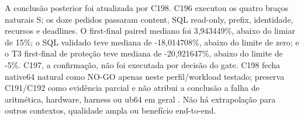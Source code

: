 A conclusão posterior foi atualizada por C198. C196 executou os quatro braços naturais S; os doze pedidos passaram content, SQL read-only, prefix, identidade, recursos e deadlines. O first-final paired mediano foi 3,943449\%, abaixo do limiar de 15\%; o SQL validado teve mediana de -18,014708\%, abaixo do limite de zero; e o T3 first-final de proteção teve mediana de -20,921647\%, abaixo do limite de -5\%. C197, a confirmação, não foi executada por decisão do gate. C198 fecha native64 natural como NO-GO apenas neste perfil/workload testado; preserva C191/C192 como evidência parcial e não atribui a conclusão a falha de aritmética, hardware, harness ou ub64 em geral . Não há extrapolação para outros contextos, qualidade ampla ou benefício end-to-end.
